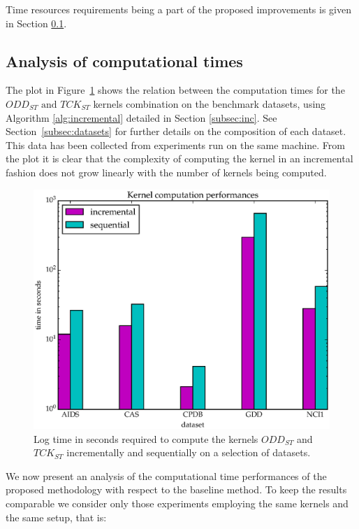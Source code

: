 Time resources requirements being a part of the proposed improvements is given
in Section \ref{subsec:time_results}.

\subsection{Analysis of computational times}
\label{subsec:time_results}

The plot in Figure~\ref{fig:times} shows the relation between the computation times
for the $ODD_{ST}\text{ and }TCK_{ST}$ kernels combination on the benchmark datasets,
using Algorithm \ref{alg:incremental} detailed in Section \ref{subsec:inc}.
See Section~\ref{subsec:datasets} for further details on the composition of each dataset.
This data has been collected from experiments run on the same machine.
From the plot it is clear that the complexity of computing the kernel in an incremental
fashion does not grow linearly with the number of kernels being computed.

\begin{figure}[ht]
    \centering
    \includegraphics[scale=0.5]{Figures/kernel_times_log}
    \caption{Log time in seconds required to compute the kernels $ODD_{ST}$ and 
    $TCK_{ST}$ incrementally and sequentially on a selection of datasets.}
    \label{fig:times}
\end{figure}

We now present an analysis of the computational time performances of the proposed methodology
with respect to the baseline method. To keep the results comparable we consider only those
experiments employing the same kernels and the same setup, that is:

